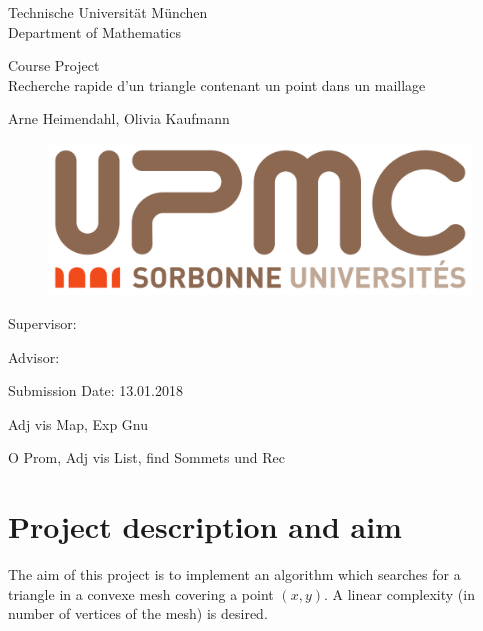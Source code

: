 \documentclass[10pt]{article}
\begin{document}
	
\begin{titlepage}
	\begin{center}
		{\Large
			Technische Universit\"at M\"unchen\\[5mm]
			Department of Mathematics\\[8mm]
		}
		\normalsize
		
		Course Project\\[15mm]
		
		{\Huge
			Recherche rapide d’un triangle contenant un point dans un maillage
		}
		\bigskip
		
		\normalsize
		
		Arne Heimendahl, Olivia Kaufmann
		
		\begin{figure}[t]
			\includegraphics[scale=0.15]{UPMC_Sorbonne_Universites.png}
		\end{figure}
		
	\end{center}
	\vspace*{75mm}
	
	Supervisor: 
	\medskip
	
	Advisor: 
	\medskip
	
	Submission Date: 13.01.2018 
	
\end{titlepage}

\newpage
\tableofcontents
\newpage

	

Adj vis Map, Exp Gnu

O Prom, Adj vis List, find Sommets und Rec

\section{Project description and aim}

The aim of this project is to implement an algorithm which searches for a triangle in a convexe mesh covering a point $(x,y)$. A linear complexity (in number of vertices of the mesh) is desired.
\end{document}
